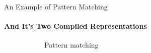 \documentclass[aspectratio=169
  , xcolor={svgnames}
  , hyperref={ colorlinks,citecolor=Blue
             , linkcolor=DarkRed,urlcolor=DarkBlue}
  , russian
  ]{beamer}
\begin{document}
\begin{frame}[fragile]{An Example of Pattern Matching}
\framesubtitle{And It's Two Compiled Representations}
\begin{figure}
\begin{subfigure}[c][6cm][b]{0.25\linewidth}
\begin{minipage}{8cm}
\matchA
\end{minipage}
\caption{Pattern matching\\ \phantom{ }}
\end{subfigure}
\hspace{0.5cm}
\begin{subfigure}[c][6cm][b]{0.32\linewidth}


\end{subfigure}
\end{figure}
\end{frame}
\end{document}
